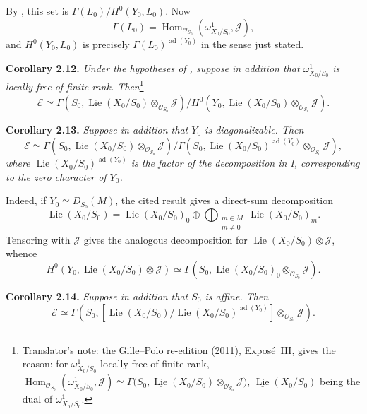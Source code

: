 By , this set is
\(\Gamma(L_0)/H^0(Y_0,L_0)\). Now
\[
 \Gamma(L_0)=
 \operatorname{Hom}_{\mathscr O_{S_0}}(\omega^1_{X_0/S_0},\mathscr J),
\]
and \(H^0(Y_0,L_0)\) is precisely
\(\Gamma(L_0)^{\operatorname{ad}(Y_0)}\) in the sense just stated.

\medskip
\noindent{}\textbf{Corollary 2.12.}
\textit{Under the hypotheses of , suppose in addition that
\(\omega^1_{X_0/S_0}\) is locally free of finite rank. Then}\footnote{Translator's note: the Gille--Polo re-edition (2011), Exposé~III,
gives the reason: for \(\omega^1_{X_0/S_0}\) locally free of finite rank,
\(\operatorname{Hom}_{\mathscr O_{S_0}}(\omega^1_{X_0/S_0},\mathscr J)\simeq
\Gamma\bigl(S_0,\underline{\operatorname{Lie}}(X_0/S_0)\otimes_{\mathscr O_{S_0}}
\mathscr J\bigr)\), \(\underline{\operatorname{Lie}}(X_0/S_0)\) being the dual of
\(\omega^1_{X_0/S_0}\).}
\[
 \mathcal E\simeq
 \Gamma\!\left(S_0,
  \operatorname{Lie}(X_0/S_0)\otimes_{\mathscr O_{S_0}}\mathscr J
 \right)
 \big/
 H^0\!\left(Y_0,
  \operatorname{Lie}(X_0/S_0)\otimes_{\mathscr O_{S_0}}\mathscr J
 \right).
\]

\medskip
\noindent{}\textbf{Corollary 2.13.}
\textit{Suppose in addition that \(Y_0\) is diagonalizable. Then}
\[
 \mathcal E\simeq
 \Gamma\!\left(S_0,
  \operatorname{Lie}(X_0/S_0)\otimes_{\mathscr O_{S_0}}\mathscr J
 \right)
 \big/
 \Gamma\!\left(S_0,
  \operatorname{Lie}(X_0/S_0)^{\operatorname{ad}(Y_0)}
  \otimes_{\mathscr O_{S_0}}\mathscr J
 \right),
\]
\textit{where
\(\operatorname{Lie}(X_0/S_0)^{\operatorname{ad}(Y_0)}\) is the factor
of the decomposition in I,  corresponding to the zero
character of \(Y_0\).}

Indeed, if \(Y_0\simeq D_{S_0}(M)\), the cited result gives a direct-sum
decomposition
\[
 \operatorname{Lie}(X_0/S_0)
 =\operatorname{Lie}(X_0/S_0)_0
 \oplus
 \bigoplus_{\substack{m\in M\\m\ne0}}
 \operatorname{Lie}(X_0/S_0)_m.
\]
Tensoring with \(\mathscr J\) gives the analogous decomposition for
\(\operatorname{Lie}(X_0/S_0)\otimes\mathscr J\), whence
\[
 H^0\!\left(Y_0,
  \operatorname{Lie}(X_0/S_0)\otimes\mathscr J\right)
 \simeq
 \Gamma\!\left(S_0,
  \operatorname{Lie}(X_0/S_0)_0
  \otimes_{\mathscr O_{S_0}}\mathscr J\right).
\]

\medskip
\noindent{}\textbf{Corollary 2.14.}
\textit{Suppose in addition that \(S_0\) is affine. Then}
\[
 \mathcal E\simeq
 \Gamma\!\left(
  S_0,
  \left[
   \operatorname{Lie}(X_0/S_0)
   \big/
   \operatorname{Lie}(X_0/S_0)^{\operatorname{ad}(Y_0)}
  \right]
  \otimes_{\mathscr O_{S_0}}\mathscr J
 \right).
\]



